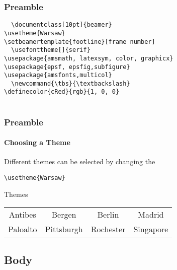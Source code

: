 \documentclass[article]{beamer}
\begin{document}
\begin{frame}[fragile]
\frametitle{Preamble}
\scriptsize{\tt{
\alert<2>{
\textbackslash documentclass[10pt]\{beamer\}\\
\textbackslash usetheme\{Warsaw\}\\
\textbackslash setbeamertemplate\{footline\}[frame number]\\
}
\vspace{0.5cm}
\alert<3>{
\textbackslash usefonttheme[]\{serif\}\\
\textbackslash usepackage\{amsmath, latexsym, color, graphicx\}\\
\textbackslash usepackage\{epsf, epsfig,subfigure\}\\
\textbackslash usepackage\{amsfonts,multicol\}\\
}
\vspace{0.5cm}
\alert<4>{
\textbackslash newcommand\{\textbackslash tbs\}\{\textbackslash textbackslash\}\\
\textbackslash definecolor\{cRed\}\{rgb\}\{1, 0, 0\}\\
}
}}
\end{frame}





\begin{frame}[fragile]
\frametitle{Preamble}
\framesubtitle{Choosing a Theme}

Different themes can be selected by changing the\\
\begin{verbatim}
\usetheme{Warsaw}
\end{verbatim}
\begin{block}{Themes}
{
\begin{center}
\begin{tabular}{cccc}
Antibes & Bergen & Berlin & Madrid\\ 
Paloalto 	& Pittsburgh & Rochester & Singapore \\
\end{tabular}
\end{center}
} \vspace{-0.5cm}
\end{block}
\end{frame}

\subsection{Body}
\end{document}
